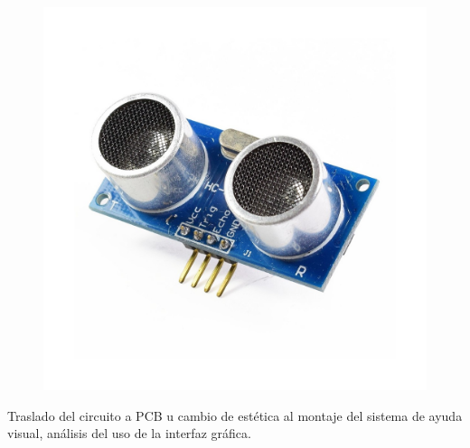 \documentclass[journal]{IEEEtran}
\begin{document}
\begin{figure}[H]
\begin{center}
    \includegraphics[scale=0.15]{images/sensor-ultrasonido-hc-sr04.jpg}
    \end{center}
\end{figure}


Traslado del circuito a PCB u cambio de estética al montaje del sistema de ayuda visual, análisis del uso de la interfaz gráfica.
\end{document}
